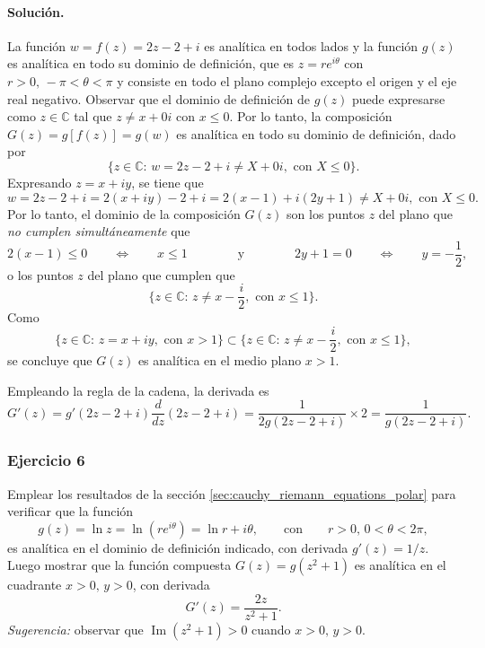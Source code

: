 \documentclass[a4paper]{report}
\renewcommand{\Im}{\operatorname{Im}}
\begin{document}
\paragraph{Solución.} La función \(w=f(z)=2z-2+i\) es analítica en todos lados y la función \(g(z)\) es analítica en todo su dominio de definición, que es \(z=re^{i\theta}\) con \(r>0,\,-\pi<\theta<\pi\) y consiste en todo el plano complejo excepto el origen y el eje real negativo. Observar que el dominio de definición de \(g(z)\) puede expresarse como \(z\in\mathbb{C}\) tal que \(z\neq x+0i\) con \(x\leq0\). Por lo tanto, la composición \(G(z)=g[f(z)]=g(w)\) es analítica en todo su dominio de definición, dado por
\[
 \{z\in\mathbb{C}:\,w=2z-2+i\neq X+0i,\textrm{ con }X\leq0\}.
\]
Expresando \(z=x+iy\), se tiene que
\[
 w=2z-2+i=2(x+iy)-2+i=2(x-1)+i(2y+1)\neq X+0i,\textrm{ con }X\leq0.
\]
Por lo tanto, el dominio de la composición \(G(z)\) son los puntos \(z\) del plano que \emph{no cumplen simultáneamente} que
\[
 2(x-1)\leq0\qquad\Leftrightarrow\qquad
 x\leq1
 \qquad\qquad\textrm{y}\qquad\qquad
 2y+1=0\qquad\Leftrightarrow\qquad
 y=-\frac{1}{2},
\]
o los puntos \(z\) del plano que cumplen que 
\[
 \{z\in\mathbb{C}:\,z\neq x-\frac{i}{2},\textrm{ con }x\leq1\}.
\]
Como
\[
 \{z\in\mathbb{C}:\,z=x+iy,\textrm{ con }x>1\}\subset\{z\in\mathbb{C}:\,z\neq x-\frac{i}{2},\textrm{ con }x\leq1\},
\]
se concluye que \(G(z)\) es analítica en el medio plano \(x>1\).

Empleando la regla de la cadena, la derivada es
\[
 G'(z)=g'(2z-2+i)\frac{d}{dz}(2z-2+i)=\frac{1}{2g(2z-2+i)}\times2=\frac{1}{g(2z-2+i)}.
\]


\subsubsection{Ejercicio 6}

Emplear los resultados de la sección \ref{sec:cauchy_riemann_equations_polar} para verificar que la función
\[
 g(z)=\ln z=\ln(re^{i\theta})=\ln r+i\theta,\qquad\textrm{con}\qquad r>0,\,0<\theta<2\pi,
\]
es analítica en el dominio de definición indicado, con derivada \(g'(z)=1/z\). Luego mostrar que la función compuesta \(G(z)=g(z^2+1)\) es analítica en el cuadrante \(x>0,\,y>0\), con derivada
\[
 G'(z)=\frac{2z}{z^2+1}.
\]
\emph{Sugerencia:} observar que \(\Im(z^2+1)>0\) cuando \(x>0,\,y>0\).
\end{document}
